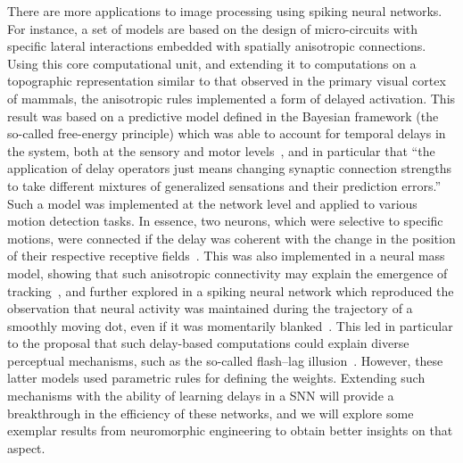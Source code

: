 \documentclass[brainsci, %
               review,accept,pdftex,moreauthors
               ]{Definitions/mdpi}
\begin{document}
There are more applications to image processing using spiking neural networks. For instance, a set of models are based on the design of micro-circuits with specific lateral interactions embedded with spatially anisotropic connections. Using this core computational unit, and extending it to computations on a topographic representation similar to that observed in the primary visual cortex of mammals, the anisotropic rules implemented a form of delayed activation. This result was based on a predictive model defined in the Bayesian framework (the so-called free-energy principle) which was able to account for temporal delays in the  system, both at the sensory and motor levels~\citep{perrinet_active_2014}, and in particular that ``the application of delay operators just means changing synaptic connection strengths to take different mixtures of generalized sensations and their prediction errors.'' Such a model was implemented at the network level and applied to various motion detection tasks. In essence, two neurons, which were selective to specific motions, were connected if the delay was coherent with the change in the position of their respective receptive fields~\citep{hogendoorn_predictive_2019}.  This was also implemented in a neural mass model, showing that such anisotropic connectivity may explain the emergence of tracking~\citep{khoei_motion-based_2013}, and further explored in a spiking neural network which reproduced the observation that neural activity was maintained during the trajectory of a smoothly moving dot, even if it was momentarily blanked~\citep{kaplan_anisotropic_2013}. This led in particular to the proposal that such delay-based computations could explain diverse perceptual mechanisms, such as the so-called flash--lag illusion~\citep{khoei_flash-lag_2017}. However, these latter models used parametric rules for defining the weights. Extending such mechanisms with the ability of learning delays in a SNN will provide a breakthrough in the efficiency of these networks, and we will explore some exemplar results from neuromorphic engineering to obtain better insights on that aspect.
%
\end{document}
